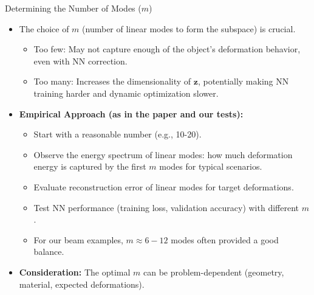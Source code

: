 \documentclass{beamer}
\begin{document}
\begin{frame}{Determining the Number of Modes (\(m\))}
    \begin{itemize}
        \item The choice of \(m\) (number of linear modes to form the subspace) is crucial.
        \begin{itemize}
            \item Too few: May not capture enough of the object's deformation behavior, even with NN correction.
            \item Too many: Increases the dimensionality of \(\bm{z}\), potentially making NN training harder and dynamic optimization slower.
        \end{itemize}
        \item \textbf{Empirical Approach (as in the paper and our tests):}
        \begin{itemize}
            \item Start with a reasonable number (e.g., 10-20).
            \item Observe the energy spectrum of linear modes: how much deformation energy is captured by the first \(m\) modes for typical scenarios.
            \item Evaluate reconstruction error of linear modes for target deformations.
            \item Test NN performance (training loss, validation accuracy) with different \(m\).
            \item For our beam examples, \(m \approx 6-12\) modes often provided a good balance.
        \end{itemize}
        \item \textbf{Consideration:} The optimal \(m\) can be problem-dependent (geometry, material, expected deformations).
    \end{itemize}
\end{frame}
\end{document}
